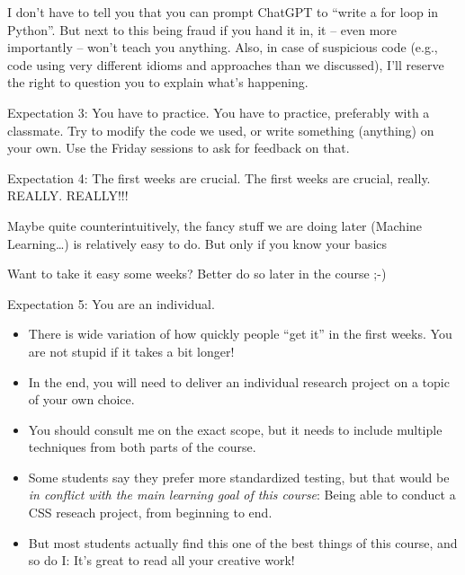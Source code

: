 \documentclass[compress]{beamer}
\begin{document}
\begin{frame}[standout]
I don't have to tell you that you can prompt ChatGPT to ``write a for loop in Python''. But next to this being fraud if you hand it in, it -- even more importantly -- won't teach you anything. Also, in case of suspicious code (e.g., code using very different idioms and approaches than we discussed), I'll reserve the right to question you to explain what's happening.
\end{frame}



\begin{frame}{Expectation 3: You have to practice.}
	You have to practice, preferably with a classmate. Try to modify the code we used, or write something (anything) on your own. Use the Friday sessions to ask for feedback on that.
\end{frame}




\begin{frame}{Expectation 4: The first weeks are crucial.}
The first weeks are crucial, really. REALLY. REALLY!!!

Maybe quite counterintuitively, the fancy stuff we are doing later (Machine Learning\ldots) is relatively easy to do. But only if you know your basics %

Want to take it easy some weeks? Better do so later in the course ;-)
\end{frame}






\begin{frame}{Expectation 5: You are an individual.}
\begin{itemize}
	\item There is wide variation of how quickly people ``get it'' in the first weeks. You are not stupid if it takes a bit longer!
	\item In the end, you will need to deliver an individual research project on a topic of your own choice.
	\item You should consult me on the exact scope, but it needs to include multiple techniques from both parts of the course.
	\item Some students say they prefer more standardized testing, but that would be \emph{in conflict with the main learning goal of this course}: Being able to conduct a CSS reseach project, from beginning to end.
	\item But most students actually find this one of the best things of this course, and so do I: It's great to read all your creative work!
\end{itemize}

\end{frame}
\end{document}
